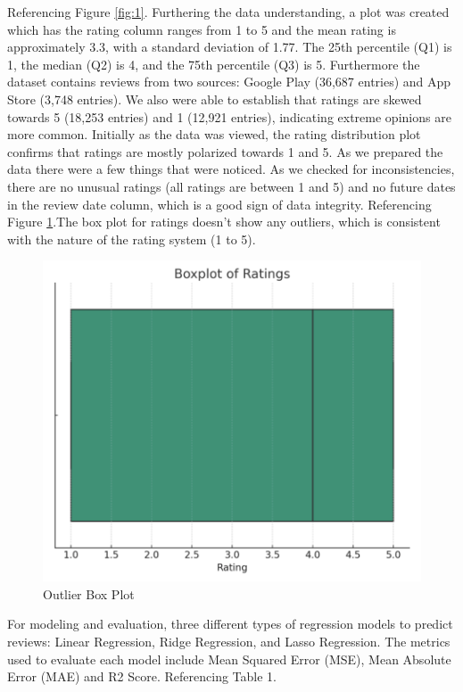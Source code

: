 \documentclass[
	a4paper, %
	10pt, %
	unnumberedsections, %
	twoside, %
]{LTJournalArticle}
\begin{document}
Referencing Figure \ref{fig:1}.
Furthering the data understanding, a plot was created which has the rating column ranges from 1 to 5 and the mean rating is approximately 3.3, with a standard deviation of 1.77. The 25th percentile (Q1) is 1, the median (Q2) is 4, and the 75th percentile (Q3) is 5. Furthermore the dataset contains reviews from two sources: Google Play (36,687 entries) and App Store (3,748 entries). We also were able to establish that ratings are skewed towards 5 (18,253 entries) and 1 (12,921 entries), indicating extreme opinions are more common. Initially as the data was viewed, the rating distribution plot confirms that ratings are mostly polarized towards 1 and 5.
As we prepared the data there were a few things that were noticed. As we checked for inconsistencies, there are no unusual ratings (all ratings are between 1 and 5) and no future dates in the review date column, which is a good sign of data integrity. Referencing Figure \ref{fig:2}.The box plot for ratings doesn't show any outliers, which is consistent with the nature of the rating system (1 to 5).
\begin{figure}
    \centering
    \includegraphics[width=1\linewidth]{Figures/boxplot.png}
    \caption{Outlier Box Plot}
    \label{fig:2}
\end{figure}


For modeling and evaluation, three different types of regression models to predict reviews: Linear Regression, Ridge Regression, and Lasso Regression. The metrics used to evaluate each model include Mean Squared Error (MSE), Mean Absolute Error (MAE) and R2 Score.
Referencing Table 1.
\end{document}
